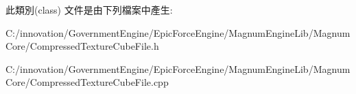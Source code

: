 此類別(class) 文件是由下列檔案中產生\+:\begin{DoxyCompactItemize}
\item 
C\+:/innovation/\+Government\+Engine/\+Epic\+Force\+Engine/\+Magnum\+Engine\+Lib/\+Magnum\+Core/Compressed\+Texture\+Cube\+File.\+h\item 
C\+:/innovation/\+Government\+Engine/\+Epic\+Force\+Engine/\+Magnum\+Engine\+Lib/\+Magnum\+Core/Compressed\+Texture\+Cube\+File.\+cpp\end{DoxyCompactItemize}
